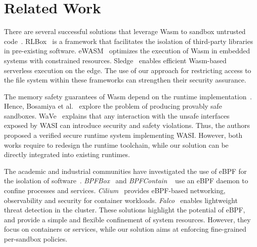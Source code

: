 \section{Related Work}
\label{rel_works}

There are several successful solutions that leverage Wasm to sandbox
untrusted code~\cite{RLBox, ewasm, sledge}. RLBox~\cite{RLBox} is a
framework that facilitates the isolation of third-party libraries in
pre-existing software. eWASM~\cite{ewasm} optimizes the execution of
Wasm in embedded systems with constrained resources. Sledge~\cite{sledge}
enables efficient Wasm-based serverless execution on the
edge. The use of our approach for restricting access to the file
system within these frameworks can strengthen their security
assurance.

The memory safety guarantees of Wasm depend on the runtime
implementation~\cite{lehmann2020everything}. Hence, Bosamiya et
al.~\cite{bosamiya2022provably} explore the problem of producing
provably safe sandboxes. WaVe~\cite{johnson2022wave} explains that any
interaction with the unsafe interfaces exposed by WASI can
introduce security and safety violations. Thus, the authors proposed
a verified secure runtime system
implementing WASI. However, both works require to redesign the runtime
toolchain, while our solution can be directly integrated into existing
runtimes.

The academic and industrial communities have investigated the use of eBPF
for the isolation of software~\cite{findlay2020bpfbox, findlay2021bpfcontain,
cilium-repo, falco}.
{\em BPFBox}~\cite{findlay2020bpfbox} and {\em BPFContain}
~\cite{findlay2021bpfcontain} use an eBPF daemon to confine processes and
services.
{\em Cilium}~\cite{cilium-repo} provides eBPF-based networking, observability
and security for container workloads.
{\em Falco}~\cite{falco} enables lightweight threat detection in the
cluster. These solutions highlight the potential of eBPF, and provide
a simple and flexible confinement of system resources. However, they
focus on containers or services, while our solution aims at enforcing
fine-grained per-sandbox policies.


